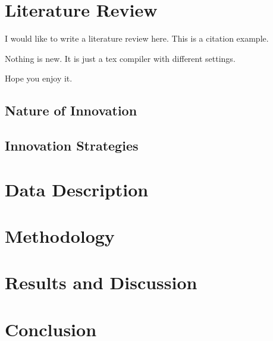 \documentclass[12pt]{article}
\theoremstyle{definition}
\numberwithin{equation}{section}
\begin{document}
\section{Literature Review}

I would like to write a literature review here. This is a citation example.

Nothing is new.  It is just a tex compiler with different settings. 

Hope you enjoy it. 


\subsection{Nature of Innovation}

\subsection{Innovation Strategies}

\section{Data Description}

\blindtext

\section{Methodology}


\section{Results and Discussion}

\section{Conclusion}






\newpage


\end{document}
